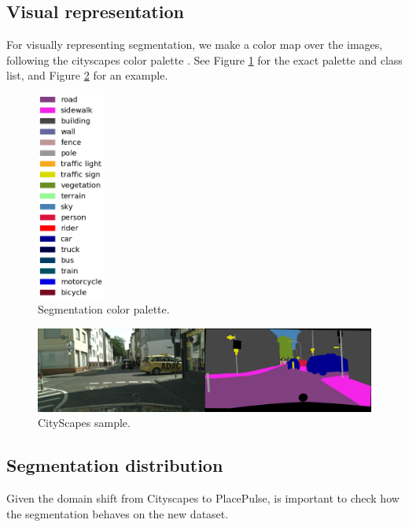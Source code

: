 \subsection{Visual representation}
\label{sec:seg_colors}
For visually representing segmentation, we make a color map over the images, following
the cityscapes color palette \cite{cordts_cityscapes}. See Figure \ref{fig:segmentation_colors}
for the exact palette and class list, and Figure \ref{fig:cs_sample} for an example.

\begin{figure}[ht]
	\begin{center}
	\includegraphics[width=0.2\textwidth]{./figures/seg_colors.png}
	\caption[Segmentation color palette]{
        Segmentation color palette.
        }
	\label{fig:segmentation_colors}
	\end{center}
\end{figure}

\begin{figure}[ht]
	\begin{center}
	\includegraphics[width=1\textwidth]{./figures/cityscapes_sample.png}
	\caption[CityScapes sample]{
        CityScapes sample.
        }
	\label{fig:cs_sample}
	\end{center}
\end{figure}

\subsection{Segmentation distribution}
\label{sec:seg_distribution}
Given the domain shift from Cityscapes to PlacePulse, is important to check how
the segmentation behaves on the new dataset.

